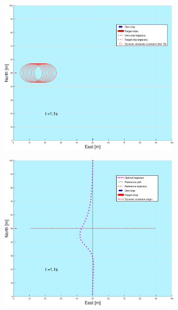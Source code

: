 \begin{figure}[!b]
\begin{subfigure}[b]{0.499\textwidth}
    \end{subfigure}
    \hfill
    \\
    \begin{subfigure}[b]{0.49\textwidth}
        \centering
        \includegraphics[width=\textwidth]{Images/Figures/enkel_SO/_Simple_1fig1_time=1}
    \end{subfigure}
    \hfill
    \begin{subfigure}[b]{0.499\textwidth}
        \centering
        \includegraphics[width=\textwidth]{Images/Figures/enkel_SO/_Simple_1fig999_time=1}

\end{subfigure}
\end{figure}
